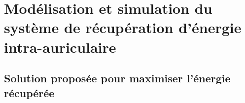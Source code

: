 

\lhead[\fancyplain{}{\leftmark}]%
      {\fancyplain{}{}} %
\chead[\fancyplain{}{}]%
      {\fancyplain{}{}}
\rhead[\fancyplain{}{}]%
      {\fancyplain{}{\rightmark}}%
\lfoot[\fancyplain{}{}]%
      {\fancyplain{}{}}
\cfoot[\fancyplain{}{\thepage}]%
      {\fancyplain{}{\thepage}} %
\rfoot[\fancyplain{}{}]%
     {\fancyplain{}{\scriptsize}}

\def \hfillx {\hspace*{ -\textwidth} \hfill} %
\raggedbottom 

\chapter{Modélisation et simulation du système de récupération d’énergie intra-auriculaire}
\label{ch:2_Modelisation et simulation du systeme}

\minitoc
\newpage

\section{Solution proposée pour maximiser l'énergie récupérée}
\label{sec:2.1_Solution proposee pour maximiser l energie recuperee}
